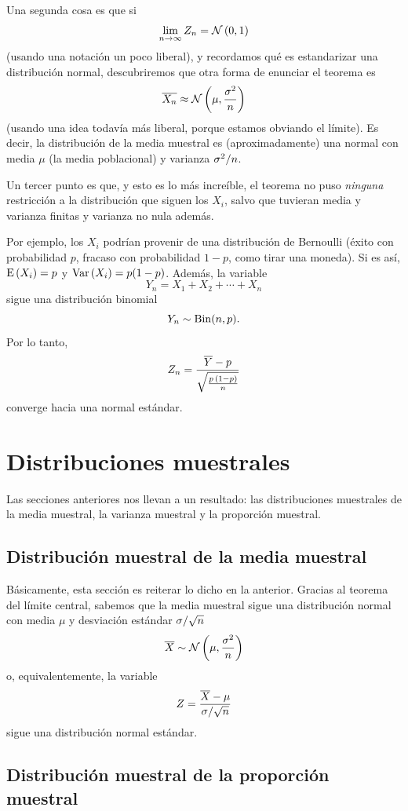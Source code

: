 Una segunda cosa es que si \[\lim_{n\to\infty}Z_n = \operatorname{\mathcal{N}}\left( 0, 1 \right)\] (usando una notación un poco liberal), y recordamos qué es estandarizar una distribución normal, descubriremos que otra forma de enunciar el teorema es \[\overline{X_n} \approx \operatorname{\mathcal{N}}\left( \mu, \frac{\sigma^2}{n} \right)\] (usando una idea todavía más liberal, porque estamos obviando el límite). Es decir, la distribución de la media muestral es (aproximadamente) una normal con media \(\mu\) (la media poblacional) y varianza \(\sigma^2/n\).

Un tercer punto es que, y esto es lo más increíble, el teorema no puso \emph{ninguna} restricción a la distribución que siguen los \(X_i\), salvo que tuvieran media y varianza finitas y varianza no nula además. 

Por ejemplo, los \(X_i\) podrían provenir de una distribución de Bernoulli (éxito con probabilidad \(p\), fracaso con probabilidad \(1-p\), como tirar una moneda). Si es así, \(\operatorname{E}\left(X_i\right) = p\) y \(\operatorname{Var}\left(X_i\right) = p(1-p)\). Además, la variable \[Y_n = X_1 + X_2 + \cdots + X_n\] sigue una distribución binomial \[Y_n \sim \operatorname{Bin}(n, p).\] Por lo tanto, \[Z_n = \frac{\overline{Y} - p}{\sqrt{\frac{p\,(1-p)}{n}}}\] converge hacia una normal estándar.

\section{Distribuciones muestrales}

Las secciones anteriores nos llevan a un resultado: las distribuciones muestrales de la media muestral, la varianza muestral y la proporción muestral. 

\subsection{Distribución muestral de la media muestral}

Básicamente, esta sección es reiterar lo dicho en la anterior. Gracias al teorema del límite central, sabemos que la media muestral sigue una distribución normal con media \(\mu\) y desviación estándar \(\sigma/\sqrt{n}\) \[\overline{X} \sim\operatorname{\mathcal{N}}\left( \mu, \frac{\sigma^2}{n} \right)\] o, equivalentemente, la variable \[Z = \frac{\overline{X} - \mu}{\sigma/\sqrt{n}}\] sigue una distribución normal estándar.

\subsection{Distribución muestral de la proporción muestral}

